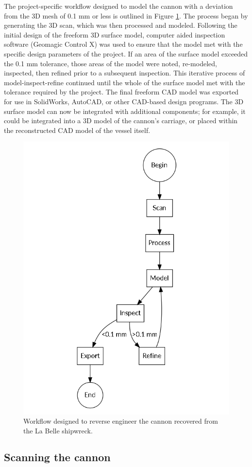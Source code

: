 \documentclass[review]{elsarticle}
\begin{document}
The project-specific workflow designed to model the cannon with a deviation from the 3D mesh of 0.1 mm or less is outlined in Figure \ref{fig:FigWorkflow}. The process began by generating the 3D scan, which was then processed and modeled. Following the initial design of the freeform 3D surface model, computer aided inspection software (Geomagic Control X) was used to ensure that the model met with the specific design parameters of the project. If an area of the surface model exceeded the 0.1 mm tolerance, those areas of the model were noted, re-modeled, inspected, then refined prior to a subsequent inspection. This iterative process of model-inspect-refine continued until the whole of the surface model met with the tolerance required by the project. The final freeform CAD model was exported for use in SolidWorks, AutoCAD, or other CAD-based design programs. The 3D surface model can now be integrated with additional components; for example, it could be integrated into a 3D model of the cannon's carriage, or placed within the reconstructed CAD model of the vessel itself. 

\begin{figure}[ht]\centering
\includegraphics[width=0.6\linewidth]{FigWorkflow}
\caption{Workflow designed to reverse engineer the cannon recovered from the La Belle shipwreck.}
\label{fig:FigWorkflow}
\end{figure}

\subsection*{Scanning the cannon}
\end{document}
